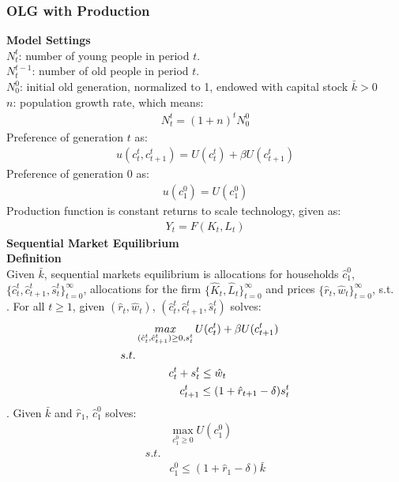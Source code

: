 \documentclass{article}
\begin{document}
\subsubsection{OLG with Production}
\textbf{Model Settings}\\
\indent $N^t_t$: number of young people in period $t$.\\
\indent $N^{t-1}_t$: number of old people in period $t$.\\
\indent $N^0_0$: initial old generation, normalized to 1, endowed with capital stock $\bar{k} > 0$\\
\indent $n$: population growth rate, which means:
	\begin{align*}
		N^t_t = (1 + n)^t N^0_0
	\end{align*}
\indent Preference of generation $t$ as:
	\begin{align*}
		u(c^t_t, c^t_{t+1}) = U(c^t_t) + \beta U(c^t_{t+1})
	\end{align*}
\indent Preference of generation $0$ as:
	\begin{align*}
		u(c^0_1) = U(c^0_1)
	\end{align*}
\indent Production function is constant returns to scale technology, given as:
	\begin{align*}
		Y_t = F(K_t, L_t)
	\end{align*}
\textbf{Sequential Market Equilibrium}\\
\textbf{Definition}\\
\indent Given $\bar{k}$, sequential markets equilibrium is allocations for households $\hat{c}^0_1$, $\{\hat{c}^t_t, \hat{c}^t_{t+1}, \hat{s}^t_t\}^\infty_{t=0}$, allocations for the firm $\{\hat{K}_t, \hat{L}_t\}^\infty_{t=0}$ and prices $\{\hat{r}_t, \hat{w}_t\}^\infty_{t=0}$, s.t.\\
. For all $t \geq 1$, given $(\hat{r}_t, \hat{w}_t)$, $(\hat{c}^t_t, \hat{c}^t_{t+1}, \hat{s}^t_t)$ solves:
	\begin{align*}
		&\mathop{max}\limits_{(\hat{c}^t_t, \hat{c}^t_{t+1}) \geq 0, s^t_t} U(c^t_t) + \beta U(c^t_{t+1})\\
		s.t.&\\
		&\indent\indent c^t_t + s^t_t \leq \hat{w}_t\\
		&\indent\indent\ \ \ c^t_{t+1} \leq (1 + \hat{r}_{t+1} - \delta)s^t_t
	\end{align*}
. Given $\bar{k}$ and $\hat{r}_1$, $\hat{c}^0_1$ solves:
	\begin{align*}
		&\mathop{max}\limits_{c^0_1 \geq 0} U(c^0_1)\\
		s.t.&\\
		& c^0_1 \leq (1 + \hat{r}_1 - \delta)\bar{k}
	\end{align*}
\end{document}
